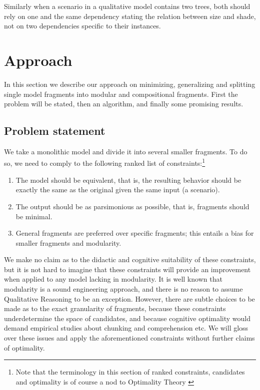 \documentclass{article} %
\begin{document}
	Similarly when a scenario in a qualitative model contains two trees,
	both should rely on one and the same dependency stating the relation
	between size and shade, not on two dependencies specific to their
	instances. 

\section{Approach}

In this section we describe our approach on minimizing, generalizing and
splitting single model fragments into modular and compositional fragments.
First the problem will be stated, then an algorithm, and finally some promising
results.

\subsection{Problem statement}

We take a monolithic model and divide it into several smaller fragments. To do
so, we need to comply to the following ranked list of
constraints:\footnote{Note that the terminology in this section of ranked
constraints, candidates and optimality is of course a nod to Optimality
Theory \cite{princesmolensky}}

\begin{enumerate}
\item The model should be equivalent, that is, the resulting behavior should
	be exactly the same as the original given the same input (a scenario).

\item The output should be as parsimonious as possible, that is, fragments
	should be minimal.

\item General fragments are preferred over specific fragments; this entails a
	bias for smaller fragments and modularity.

\end{enumerate}

We make no claim as to the didactic and cognitive suitability of these
constraints, but it is not hard to imagine that these constraints will provide
an improvement when applied to any model lacking in modularity. It is well
known that modularity is a sound engineering approach, and there is no reason
to assume Qualitative Reasoning to be an exception. However, there are subtle
choices to be made as to the exact granularity of fragments, because these
constraints underdetermine the space of candidates, and because cognitive
optimality would demand empirical studies about chunking and comprehension
etc. We will gloss over these issues and apply the aforementioned constraints
without further claims of optimality.
\end{document}
